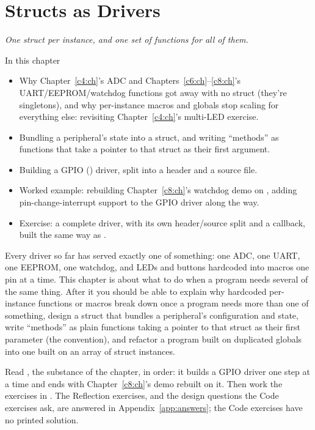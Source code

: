 
\chapter{Structs as Drivers}
\label{c9:ch}

{\large\itshape One struct per instance, and one set of functions for all of them.\par}

\begin{chapterbox}{In this chapter}
\begin{itemize}
  \item Why Chapter~\ref{c4:ch}'s ADC and Chapters~\ref{c6:ch}--\ref{c8:ch}'s
    UART/EEPROM/watchdog functions got away with no struct (they're singletons), and why
    per-instance macros and globals stop scaling for everything else: revisiting
    Chapter~\ref{c4:ch}'s multi-LED exercise.
  \item Bundling a peripheral's state into a struct, and writing ``methods'' as functions that
    take a pointer to that struct as their first argument.
  \item Building a GPIO () driver, split into a header and a source file.
  \item Worked example: rebuilding Chapter~\ref{c8:ch}'s watchdog demo on , adding
    pin-change-interrupt support to the GPIO driver along the way.
  \item Exercise: a complete  driver, with its own header/source split and a
    callback, built the same way as .
\end{itemize}
\end{chapterbox}

Every driver so far has served exactly one of something: one ADC, one UART, one EEPROM, one
watchdog, and LEDs and buttons hardcoded into macros one pin at a time. This chapter is about what
to do when a program needs several of the same thing. After it you should be able to explain why
hardcoded per-instance functions or macros break down once a program needs more than one of
something, design a struct that bundles a peripheral's configuration and state, write ``methods''
as plain functions taking a pointer to that struct as their first parameter (the 
convention), and refactor a program built on duplicated globals into one built on an array of
struct instances.

Read , the substance of the chapter, in order: it builds a GPIO driver one
step at a time and ends with Chapter~\ref{c8:ch}'s demo rebuilt on it. Then work the exercises in
. The Reflection exercises, and the design questions the Code exercises
ask, are answered in Appendix~\ref{app:answers}; the Code exercises have no printed solution.




